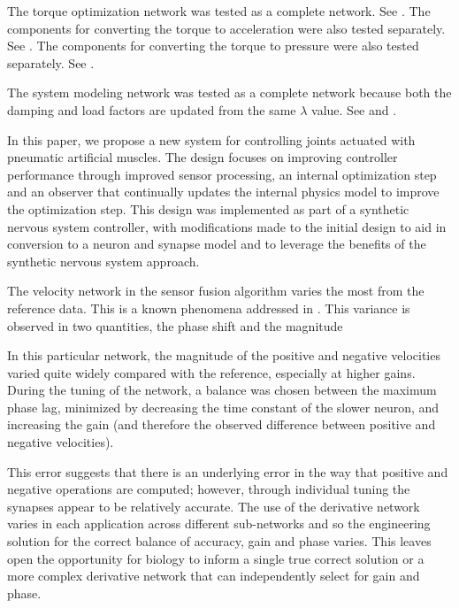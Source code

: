 
The torque optimization network was tested as a complete network. See
. The components for converting the torque to
acceleration were also tested
separately. See .
The components for converting the torque to pressure were also tested
separately. See .


The system modeling network was tested as a complete network because both the
damping and load factors are updated from the same $\lambda$ value. See  and .

\label{chap:discussion}

In this paper, we propose a new system for controlling joints actuated with
pneumatic artificial muscles. The design focuses on improving controller
performance through improved sensor processing, an internal optimization step
and an observer that continually updates the internal physics model to improve
the optimization step. This design was implemented as part of a synthetic
nervous system controller, with modifications made to the initial design to aid
in conversion to a neuron and synapse model and to leverage the benefits of the
synthetic nervous system approach.


The velocity network in the sensor fusion algorithm varies the most from the
reference data. This is a known phenomena addressed in
\cite{NickFunctionalSubnetwork}. This variance is observed in two quantities,
the phase shift and the magnitude

In this particular network, the magnitude of the positive and negative
velocities varied quite widely compared with the reference, especially at
higher gains. During the tuning of the network, a balance was chosen between
the maximum phase lag, minimized by decreasing the time constant of the slower
neuron, and increasing the gain (and therefore the observed difference between
positive and negative velocities).

This error suggests that there is an underlying error in the way that positive
and negative operations are computed; however, through individual tuning the
synapses appear to be relatively accurate. The use of the derivative network
varies in each application across different sub-networks and so the engineering
solution for the correct balance of accuracy, gain and phase varies. This
leaves open the opportunity for biology to inform a single true correct
solution or a more complex derivative network that can independently select for
gain and phase.

